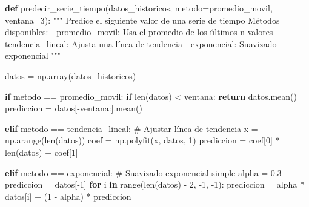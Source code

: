 \documentclass[
  doc,
  floatsintext,
  longtable,
  a4paper,
  nolmodern,
  notxfonts,
  notimes,
  12pt,
  colorlinks=true,linkcolor=blue,citecolor=blue,urlcolor=blue]{apa7}
\newenvironment{Shaded}{\begin{snugshade}}{\end{snugshade}}
\newcommand{\BuiltInTok}[1]{\textcolor[rgb]{0.00,0.23,0.31}{#1}}
\newcommand{\CommentTok}[1]{\textcolor[rgb]{0.37,0.37,0.37}{#1}}
\newcommand{\ControlFlowTok}[1]{\textcolor[rgb]{0.00,0.23,0.31}{\textbf{#1}}}
\newcommand{\DecValTok}[1]{\textcolor[rgb]{0.68,0.00,0.00}{#1}}
\newcommand{\FloatTok}[1]{\textcolor[rgb]{0.68,0.00,0.00}{#1}}
\newcommand{\KeywordTok}[1]{\textcolor[rgb]{0.00,0.23,0.31}{\textbf{#1}}}
\newcommand{\NormalTok}[1]{\textcolor[rgb]{0.00,0.23,0.31}{#1}}
\newcommand{\OperatorTok}[1]{\textcolor[rgb]{0.37,0.37,0.37}{#1}}
\newcommand{\StringTok}[1]{\textcolor[rgb]{0.13,0.47,0.30}{#1}}
\begin{document}
\begin{Shaded}
\begin{Highlighting}[]
\KeywordTok{def}\NormalTok{ predecir\_serie\_tiempo(datos\_historicos, metodo}\OperatorTok{=}\StringTok{\textquotesingle{}promedio\_movil\textquotesingle{}}\NormalTok{, ventana}\OperatorTok{=}\DecValTok{3}\NormalTok{):}
    \CommentTok{"""}
\CommentTok{    Predice el siguiente valor de una serie de tiempo}
\CommentTok{    }
\CommentTok{    Métodos disponibles:}
\CommentTok{    {-} \textquotesingle{}promedio\_movil\textquotesingle{}: Usa el promedio de los últimos n valores}
\CommentTok{    {-} \textquotesingle{}tendencia\_lineal\textquotesingle{}: Ajusta una línea de tendencia}
\CommentTok{    {-} \textquotesingle{}exponencial\textquotesingle{}: Suavizado exponencial}
\CommentTok{    """}
    
\NormalTok{    datos }\OperatorTok{=}\NormalTok{ np.array(datos\_historicos)}
    
    \ControlFlowTok{if}\NormalTok{ metodo }\OperatorTok{==} \StringTok{\textquotesingle{}promedio\_movil\textquotesingle{}}\NormalTok{:}
        \ControlFlowTok{if} \BuiltInTok{len}\NormalTok{(datos) }\OperatorTok{\textless{}}\NormalTok{ ventana:}
            \ControlFlowTok{return}\NormalTok{ datos.mean()}
\NormalTok{        prediccion }\OperatorTok{=}\NormalTok{ datos[}\OperatorTok{{-}}\NormalTok{ventana:].mean()}
    
    \ControlFlowTok{elif}\NormalTok{ metodo }\OperatorTok{==} \StringTok{\textquotesingle{}tendencia\_lineal\textquotesingle{}}\NormalTok{:}
        \CommentTok{\# Ajustar línea de tendencia}
\NormalTok{        x }\OperatorTok{=}\NormalTok{ np.arange(}\BuiltInTok{len}\NormalTok{(datos))}
\NormalTok{        coef }\OperatorTok{=}\NormalTok{ np.polyfit(x, datos, }\DecValTok{1}\NormalTok{)}
\NormalTok{        prediccion }\OperatorTok{=}\NormalTok{ coef[}\DecValTok{0}\NormalTok{] }\OperatorTok{*} \BuiltInTok{len}\NormalTok{(datos) }\OperatorTok{+}\NormalTok{ coef[}\DecValTok{1}\NormalTok{]}
    
    \ControlFlowTok{elif}\NormalTok{ metodo }\OperatorTok{==} \StringTok{\textquotesingle{}exponencial\textquotesingle{}}\NormalTok{:}
        \CommentTok{\# Suavizado exponencial simple}
\NormalTok{        alpha }\OperatorTok{=} \FloatTok{0.3}
\NormalTok{        prediccion }\OperatorTok{=}\NormalTok{ datos[}\OperatorTok{{-}}\DecValTok{1}\NormalTok{]}
        \ControlFlowTok{for}\NormalTok{ i }\KeywordTok{in} \BuiltInTok{range}\NormalTok{(}\BuiltInTok{len}\NormalTok{(datos) }\OperatorTok{{-}} \DecValTok{2}\NormalTok{, }\OperatorTok{{-}}\DecValTok{1}\NormalTok{, }\OperatorTok{{-}}\DecValTok{1}\NormalTok{):}
\NormalTok{            prediccion }\OperatorTok{=}\NormalTok{ alpha }\OperatorTok{*}\NormalTok{ datos[i] }\OperatorTok{+}\NormalTok{ (}\DecValTok{1} \OperatorTok{{-}}\NormalTok{ alpha) }\OperatorTok{*}\NormalTok{ prediccion}
    

\end{Highlighting}
\end{Shaded}
\end{document}
